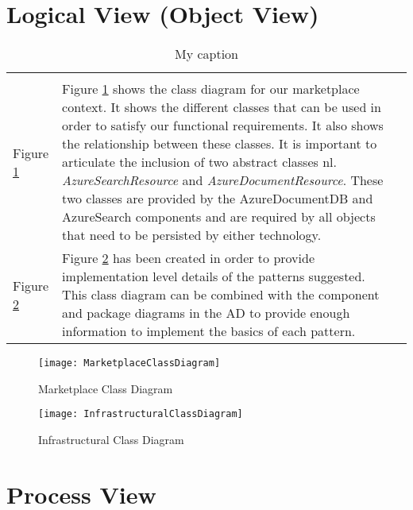 \section{Logical View (Object View)}

\begin{table}[h]
\centering
\begin{tabularx}{\textwidth}{lXl}
\cline{1-2}
\multicolumn{2}{|c|}{\cellcolor[HTML]{EFEFEF}{\color[HTML]{000000} Logical View}} &  \\ \cline{1-2}
\multicolumn{1}{|l|}{Figure \ref{fig:marketclass}} & \multicolumn{1}{X|}{Figure \ref{fig:marketclass} shows the class diagram for our marketplace context. It shows the different classes that can be used in order to satisfy our functional requirements. It also shows the relationship between these classes. It is important to articulate the inclusion of two abstract classes nl. \textit{AzureSearchResource} and \textit{AzureDocumentResource}. These two classes are provided by the AzureDocumentDB and AzureSearch components and are required by all objects that need to be persisted by either technology.} &  \\ \cline{1-2}
\multicolumn{1}{|l|}{Figure \ref{fig:infraclass}} & \multicolumn{1}{X|}{Figure \ref{fig:infraclass} has been created in order to provide implementation level details of the patterns suggested. This class diagram can be combined with the component and package diagrams in the AD to provide enough information to implement the basics of each pattern.} &  \\ \cline{1-2}
\cline{1-2}
\end{tabularx}
\caption{My caption}
\label{my-label}
\end{table}


\begin{figure}
\centering
\texttt{[image: MarketplaceClassDiagram]}
\caption{Marketplace Class Diagram}
\label{fig:marketclass}
\end{figure}


\begin{figure}
\centering
\texttt{[image: InfrastructuralClassDiagram]}
\caption{Infrastructural Class Diagram}
\label{fig:infraclass}
\end{figure}


\section{Process View}


